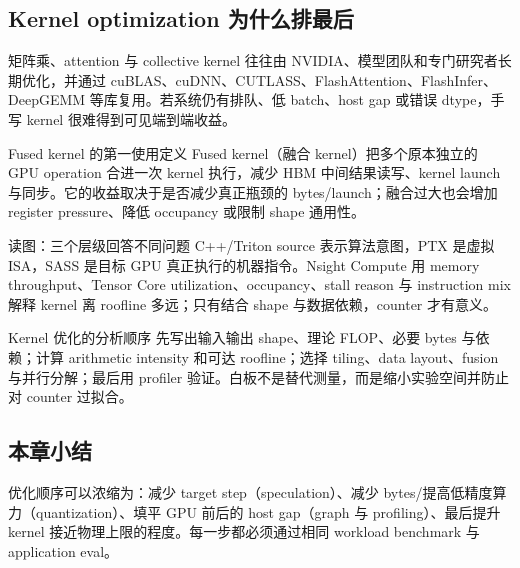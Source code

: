 \subsection{Kernel optimization 为什么排最后}

矩阵乘、attention 与 collective kernel 往往由 NVIDIA、模型团队和专门研究者长期优化，并通过 cuBLAS、cuDNN、CUTLASS、FlashAttention、FlashInfer、DeepGEMM 等库复用。若系统仍有排队、低 batch、host gap 或错误 dtype，手写 kernel 很难得到可见端到端收益。


\begin{knowledgebox}{Fused kernel 的第一使用定义}
Fused kernel（融合 kernel）把多个原本独立的 GPU operation 合进一次 kernel 执行，减少 HBM 中间结果读写、kernel launch 与同步。它的收益取决于是否减少真正瓶颈的 bytes/launch；融合过大也会增加 register pressure、降低 occupancy 或限制 shape 通用性。
\end{knowledgebox}


\begin{knowledgebox}{读图：三个层级回答不同问题}
C++/Triton source 表示算法意图，PTX 是虚拟 ISA，SASS 是目标 GPU 真正执行的机器指令。Nsight Compute 用 memory throughput、Tensor Core utilization、occupancy、stall reason 与 instruction mix 解释 kernel 离 roofline 多远；只有结合 shape 与数据依赖，counter 才有意义。
\end{knowledgebox}


\begin{importantbox}{Kernel 优化的分析顺序}
先写出输入输出 shape、理论 FLOP、必要 bytes 与依赖；计算 arithmetic intensity 和可达 roofline；选择 tiling、data layout、fusion 与并行分解；最后用 profiler 验证。白板不是替代测量，而是缩小实验空间并防止对 counter 过拟合。
\end{importantbox}

\subsection{本章小结}

优化顺序可以浓缩为：减少 target step（speculation）、减少 bytes/提高低精度算力（quantization）、填平 GPU 前后的 host gap（graph 与 profiling）、最后提升 kernel 接近物理上限的程度。每一步都必须通过相同 workload benchmark 与 application eval。

